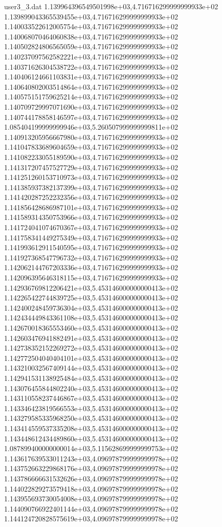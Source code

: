 \begin{filecontents}{user3_3.dat}
1.139964396549501998e+03,4.716716299999999933e+02
1.139899043365539455e+03,4.716716299999999933e+02
1.140033522612005754e+03,4.716716299999999933e+02
1.140068070464060838e+03,4.716716299999999933e+02
1.140502824806565059e+03,4.716716299999999933e+02
1.140237097562582221e+03,4.716716299999999933e+02
1.140371626304538722e+03,4.716716299999999933e+02
1.140406124661103831e+03,4.716716299999999933e+02
1.140640802003514864e+03,4.716716299999999933e+02
1.140575151759625214e+03,4.716716299999999933e+02
1.140709729997071690e+03,4.716716299999999933e+02
1.140744178858146597e+03,4.716716299999999933e+02
1.085404199999999946e+03,5.260507999999999811e+02
1.140913205956667980e+03,4.716716299999999933e+02
1.141047833689604659e+03,4.716716299999999933e+02
1.141082233055189590e+03,4.716716299999999933e+02
1.141317207457527729e+03,4.716716299999999933e+02
1.141251260153710973e+03,4.716716299999999933e+02
1.141385937382137399e+03,4.716716299999999933e+02
1.141420287252232356e+03,4.716716299999999933e+02
1.141856428686987101e+03,4.716716299999999933e+02
1.141589314350753966e+03,4.716716299999999933e+02
1.141724041074670367e+03,4.716716299999999933e+02
1.141758341449275349e+03,4.716716299999999933e+02
1.141993612911540595e+03,4.716716299999999933e+02
1.141927368547796732e+03,4.716716299999999933e+02
1.142062144767203336e+03,4.716716299999999933e+02
1.142096395646318115e+03,4.716716299999999933e+02
1.142936769812206421e+03,5.453146000000000413e+02
1.142265422744839725e+03,5.453146000000000413e+02
1.142400248459736304e+03,5.453146000000000413e+02
1.142434449843361108e+03,5.453146000000000413e+02
1.142670018365553460e+03,5.453146000000000413e+02
1.142603476941882491e+03,5.453146000000000413e+02
1.142738352152269272e+03,5.453146000000000413e+02
1.142772504040404101e+03,5.453146000000000413e+02
1.143210032567409144e+03,5.453146000000000413e+02
1.142941531138925484e+03,5.453146000000000413e+02
1.143076455844802240e+03,5.453146000000000413e+02
1.143110558237446867e+03,5.453146000000000413e+02
1.143346423819566553e+03,5.453146000000000413e+02
1.143279585335968250e+03,5.453146000000000413e+02
1.143414559537335208e+03,5.453146000000000413e+02
1.143448612434489860e+03,5.453146000000000413e+02
1.087899400000000014e+03,5.115628699999999753e+02
1.143617639533011243e+03,4.096978799999999978e+02
1.143752663229868176e+03,4.096978799999999978e+02
1.143786666631532626e+03,4.096978799999999978e+02
1.144022829273579418e+03,4.096978799999999978e+02
1.143955693730054008e+03,4.096978799999999978e+02
1.144090766922401144e+03,4.096978799999999978e+02
1.144124720828575619e+03,4.096978799999999978e+02

\end{filecontents}

